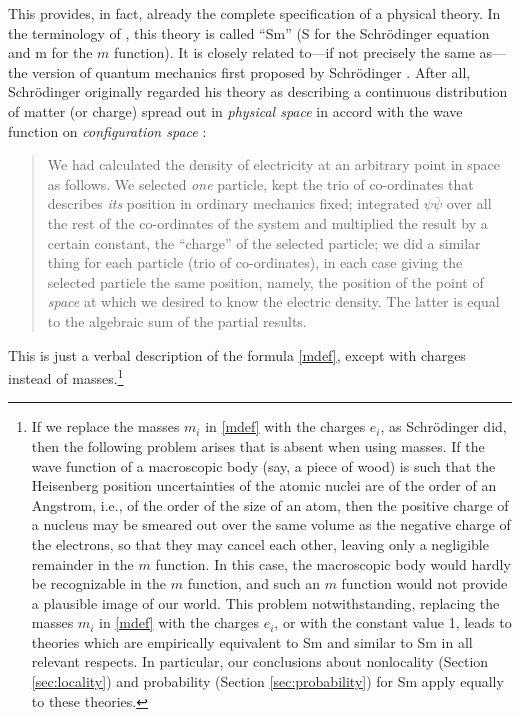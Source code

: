 \documentclass[12pt]{article}
\newcommand{\z}[1]{{#1}}
\begin{document}
This provides, in fact, already the complete specification of a physical theory. In the terminology of \cite{AGTZ06}, this theory is called  ``Sm'' (S for the Schr\"odinger equation and m for the $m$ function). It is closely related to---if not precisely the same as---the version of quantum mechanics first proposed by Schr\"odinger \cite{sch1}. 
After all, Schr\"odinger originally regarded his theory as describing a
continuous distribution of matter (or charge) spread out in {\em physical
space} in accord with the wave function on {\em configuration space}
\cite[p.~120]{sch}:
 \begin{quotation}
 We had calculated the density of electricity at an arbitrary point in
 space as follows. We selected \emph{one} particle, kept the trio of
 co-ordinates that describes \emph{its} position in ordinary mechanics
 fixed; integrated $\psi\overline{\psi}$ over all the rest of the
 co-ordinates of the system and multiplied the result by a certain
 constant, the ``charge'' of the selected particle; we did a similar thing
 for each particle (trio of co-ordinates), in each case giving the
 selected particle the same position, namely, the position of the point of
 \emph{space} at which we desired to know the electric density. The latter
 is equal to the algebraic sum of the partial results.
 \end{quotation}
This is just a verbal description of the formula \eqref{mdef}, except with charges instead of masses.\footnote{If we replace the masses $m_i$ in \eqref{mdef} with the charges $e_i$, as Schr\"odinger did, then the following problem arises that is absent when using masses. If the wave function of a macroscopic body (say, a piece of wood) is such that the Heisenberg position uncertainties of the atomic nuclei are of the order of an Angstrom, i.e., of the order of the size of an atom, then the positive charge of a nucleus may be smeared out over the same volume as the negative charge of the electrons, so that they may cancel each other, leaving only a negligible remainder in the $m$ function. In this case, the macroscopic body would hardly be recognizable in the $m$ function, and such an $m$ function would not provide a plausible image of our world. \z{This problem notwithstanding}, replacing the masses $m_i$ in \eqref{mdef} with the charges $e_i$, or with the constant value 1, leads to theories which are empirically equivalent to Sm and similar to Sm in all relevant \z{respects}. In particular, our conclusions about nonlocality (Section \ref{sec:locality}) and probability (Section \ref{sec:probability}) for Sm apply equally to these \z{theories}.}
\end{document}
